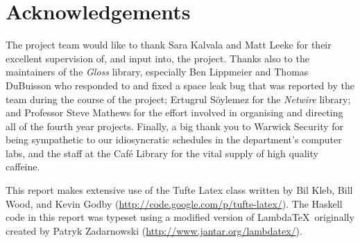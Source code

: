 \chapter{Acknowledgements}

\begin{fullwidth}

The project team would like to thank Sara Kalvala and Matt Leeke for their excellent supervision of, and input into, the project. Thanks also to the maintainers of the \emph{Gloss} library, especially Ben Lippmeier and Thomas DuBuisson who responded to and fixed a space leak bug that was reported by the team during the course of the project; Ertugrul S\"oylemez for the \emph{Netwire} library; and Professor Steve Mathews for the effort involved in organising and directing all of the fourth year projects. Finally, a big thank you to Warwick Security for being sympathetic to our idiosyncratic schedules in the department's computer labs, and the staff at the Caf\'e Library for the vital supply of high quality caffeine. 

\vspace{1em}\noindent
This report makes extensive use of the Tufte Latex class written by Bil Kleb, Bill Wood, and Kevin Godby (\url{http://code.google.com/p/tufte-latex/}). 
The Haskell code in this report was typeset using a modified version of Lambda\TeX\ originally created by Patryk Zadarnowski (\url{http://www.jantar.org/lambdatex/}).

\end{fullwidth}